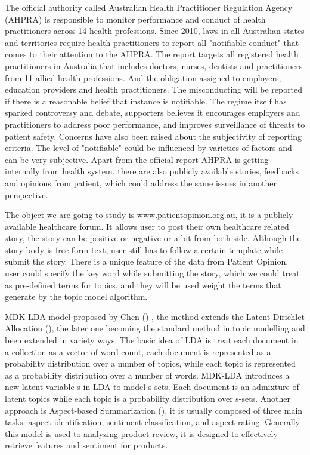 \documentclass[11pt,twoside]{report}
\begin{document}
The official authority called Australian Health Practitioner Regulation Agency (AHPRA) is responsible to monitor performance and conduct of health practitioners across 14 health professions. Since 2010, laws in all Australian states and territories require health practitioners to report all "notifiable conduct" that comes to their attention to the AHPRA. The report targets all registered health practitioners in Australia that includes doctors, nurses, dentists and practitioners from 11 allied health professions. And the obligation assigned to employers, education providers and health practitioners. The misconducting will be reported if there is a reasonable belief that instance is notifiable. The regime itself has sparked controversy and debate, supporters believes it encourages employers and practitioners to address poor performance, and improves surveillance of threats to patient safety. Concerns have also been raised about the subjectivity of reporting criteria. The level of "notifiable" could be influenced by varieties of factors and can be very subjective. 
Apart from the official report AHPRA is getting internally from health system, there are also publicly available stories, feedbacks and opinions from patient, which could address the same issues in another perspective. 

The object we are going to study is www.patientopinion.org.au, it is a publicly available healthcare forum. It allows user to post their own healthcare related story,  the story can be positive or negative or a bit from both side. Although the story body is free form text, user still has to follow a certain template while submit the story. There is a unique feature of the data from Patient Opinion, user could specify the key word while submitting the story, which we could treat as pre-defined terms for topics, and they will be used weight the terms that generate by the topic model algorithm. 

MDK-LDA model proposed by Chen (\cite{ref24}) , the method extends the Latent Dirichlet Allocation (\cite{ref25}), the later one becoming the standard method in topic modelling and been extended in variety ways. The basic idea of LDA is treat each document in a collection as a vector of word count, each document is represented as a probability distribution over a number of topics, while each topic is represented as a probability distribution over a number of words. MDK-LDA introduces a new latent variable s in LDA to model s-sets. Each document is an admixture of latent topics while each topic is a probability distribution over s-sets. Another approach is Aspect-based Summarization (\cite{ref11}), it is usually composed of three main tasks: aspect identification, sentiment classification, and aspect rating. Generally this model is used to analyzing product review, it is designed to effectively retrieve features and sentiment for products.
\end{document}
